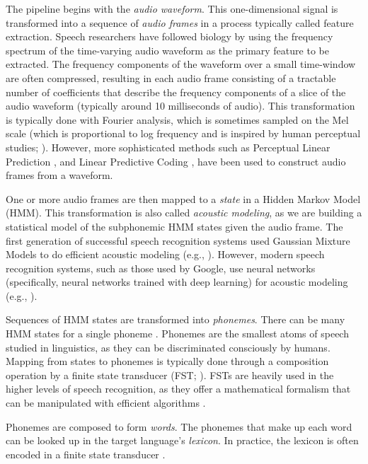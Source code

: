 \documentclass{article}
\begin{document}
The pipeline begins with the \textit{audio waveform}.
This one-dimensional signal is transformed
into a sequence of \textit{audio frames}
in a process typically called feature extraction.
Speech researchers have followed
biology by using the frequency spectrum
of the time-varying audio waveform
as the primary feature to be extracted.
The frequency components of the waveform
over a small time-window are often compressed,
resulting in each audio frame consisting of
a tractable number of coefficients
that describe the frequency components
of a slice of the audio waveform
(typically around 10 milliseconds of audio).
This transformation is typically done
with Fourier analysis,
which is sometimes sampled
on the Mel scale
(which is proportional to
log frequency and is inspired
by human perceptual studies; \citealp{stevens1937,furui1981}).
However, more sophisticated methods
such as Perceptual Linear Prediction \citep{hermansky1990},
and Linear Predictive Coding \citep{oshaughnessy1988},
have been used to construct audio frames from a waveform.

One or more audio frames are then mapped
to a \textit{state}
in a Hidden Markov Model (HMM).
This transformation is also called
\textit{acoustic modeling},
as we are building a statistical model
of the subphonemic HMM states
given the audio frame.
The first generation of successful
speech recognition systems
used Gaussian Mixture Models
to do efficient acoustic modeling
(e.g., \citealp{reynolds1995}).
However, modern speech recognition systems,
such as those used by Google,
use neural networks
(specifically, neural networks trained with deep learning)
for acoustic modeling
(e.g., \citealp{jaitly2012}).

Sequences of HMM states are transformed
into \textit{phonemes}.
There can be many HMM states
for a single phoneme \citep{rabiner1989}.
Phonemes are the smallest atoms of speech
studied in linguistics,
as they can be discriminated consciously by humans.
Mapping from states to phonemes
is typically done through a composition operation
by a finite state transducer (FST; \citealp{mohri2002}).
FSTs are heavily used in the higher levels
of speech recognition,
as they offer a mathematical formalism
that can be manipulated with efficient algorithms
\citep{mohri2000}.

Phonemes are composed to form \textit{words}.
The phonemes that make up each word
can be looked up
in the target language's \textit{lexicon}.
In practice, the lexicon is often encoded
in a finite state transducer
\citep{mohri2002}.
\end{document}
